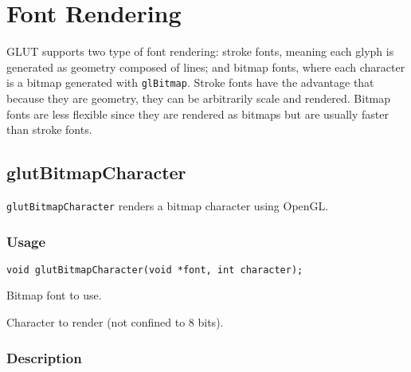 \section{Font Rendering}

GLUT supports two type of font rendering:  stroke fonts,
meaning each glyph is generated as geometry
composed of lines; and bitmap fonts, where each character
is a bitmap generated with {\tt glBitmap}.  Stroke fonts have
the advantage that because they are geometry, they can
be arbitrarily scale and rendered.  Bitmap fonts are
less flexible since they are rendered as bitmaps but are
usually faster than stroke fonts.

\subsection{glutBitmapCharacter}

{\tt glutBitmapCharacter} renders a bitmap character using OpenGL.

\subsubsection*{Usage}
\begin{verbatim}
void glutBitmapCharacter(void *font, int character);
\end{verbatim}
\begin{description}
\itemsep 0in
\item[\tt font]
Bitmap font to use.
\item[\tt character]
Character to render (not confined to 8 bits).
\end{description}

\subsubsection*{Description}

